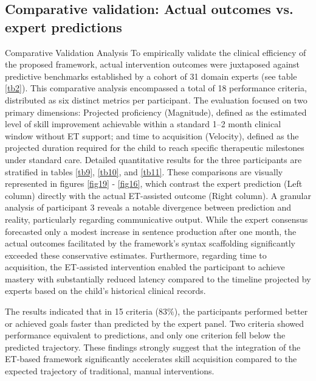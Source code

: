 \subsection{Comparative validation: Actual outcomes vs. expert predictions}
Comparative Validation Analysis
To empirically validate the clinical efficiency of the proposed framework, actual intervention outcomes were juxtaposed against predictive benchmarks established by a cohort of 31 domain experts (see table \ref{tb2}). This comparative analysis encompassed a total of 18 performance criteria, distributed as six distinct metrics per participant. The evaluation focused on two primary dimensions: Projected proficiency (Magnitude), defined as the estimated level of skill improvement achievable within a standard 1–2 month clinical window without ET support; and time to acquisition (Velocity), defined as the projected duration required for the child to reach specific therapeutic milestones under standard care.
Detailed quantitative results for the three participants are stratified in tables \ref{tb9}, \ref{tb10}, and \ref{tb11}. These comparisons are visually represented in figures \ref{fig19} - \ref{fig16}, which contrast the expert prediction (Left column) directly with the actual ET-assisted outcome (Right column). A granular analysis of participant 3 reveals a notable divergence between prediction and reality, particularly regarding communicative output. While the expert consensus forecasted only a modest increase in sentence production after one month, the actual outcomes facilitated by the framework's syntax scaffolding significantly exceeded these conservative estimates. Furthermore, regarding time to acquisition, the ET-assisted intervention enabled the participant to achieve mastery with substantially reduced latency compared to the timeline projected by experts based on the child's historical clinical records.





 The results indicated that in 15 criteria ($83\%$), the participants performed better or achieved goals faster than predicted by the expert panel. Two criteria showed performance equivalent to predictions, and only one criterion fell below the predicted trajectory. These findings strongly suggest that the integration of the ET-based framework significantly accelerates skill acquisition compared to the expected trajectory of traditional, manual interventions.





































